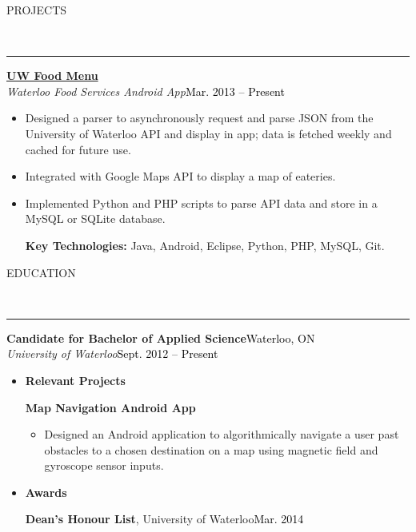 \documentclass[11pt, letterpaper, oneside]{article}
\newcommand{\HRule}[2]{\textcolor{#1}{\rule{\linewidth}{#2}}}
\newcommand{\sectiontitle}[1]{\begin{minipage}{\textwidth}\vspace{-7.5pt}\begin{flushleft}\hspace{-20.5pt}\vspace{-25pt}
\Large\MakeUppercase{#1}\end{flushleft}\end{minipage}\\\HRule{black}{0.15mm}\vspace{\baselineskip}}
\newenvironment{ressection}[1]{
  \sectiontitle{#1}}
  {\vspace{-\baselineskip}}
\newcommand{\resentryheader}[4]{
    \vspace{-6pt}
    \textbf{#1}\hspace{\stretch{1}}\textcolor{black}{#3}\\
    \textit{#2}\hspace{\stretch{1}}\textcolor{black}{#4}\\
}
\newcommand{\resitem}[1]{
    \vspace{2pt}
    \item \begin{flushleft} #1 \end{flushleft}
}
\newcommand{\resinneritem}[1]{
	\vspace{-5pt}
    \item \begin{flushleft} #1 \end{flushleft}
}
\newcommand{\resawardentry}[3]{
  \begin{minipage}{6.3in}
  \hspace{-24pt}\textbf{#1},
  {#2}\hfill\textcolor{black}{#3}\\
  \vspace{-5pt}
  \vspace{0.5\baselineskip}
  \end{minipage}
}
\newenvironment{resentry}[4]{
  \begin{minipage}{\textwidth}
  \vspace{-3pt}
    \resentryheader{#1}{#2}{#3}{#4}
        \vspace{-\baselineskip}
    \begin{itemize}[noitemsep,nolistsep]
}{
    \end{itemize}
        \vspace{\baselineskip}
        \end{minipage}
}
\begin{document}
\begin{ressection}{Projects}
  \begin{resentry}{\href{https://play.google.com/store/apps/details?id=ca.uwaterloo.uwfoodservices&hl=en}{UW Food Menu}}{Waterloo Food Services Android App}{}{Mar. 2013 -- Present}
    \resitem{Designed a parser to asynchronously request and parse JSON from the University of Waterloo API and display in app; data is fetched weekly and cached for future use.}
    \resitem{Integrated with Google Maps API to display a map of eateries.}
    \resitem{Implemented Python and PHP scripts to parse API data and store in a MySQL or SQLite database.}
    \vspace{4pt} \hspace{-15pt}
    \textbf{Key Technologies:} Java, Android, Eclipse, Python, PHP, MySQL, Git.
  \end{resentry}
\end{ressection}

\begin{ressection}{Education}
  \begin{resentry}{Candidate for Bachelor of Applied Science}{University of Waterloo}{Waterloo, ON}{Sept. 2012 -- Present}
    \resitem{\textbf{Relevant Projects}}
	\textbf{\hspace{5pt}Map Navigation Android App}   
    \begin{itemize}
		\resinneritem{Designed an Android application to algorithmically navigate a user past obstacles to a chosen destination on a map using magnetic field and gyroscope sensor inputs.}
	\end{itemize}
	\resitem{\textbf{Awards}}
	\begin{itemize}
  	\resawardentry{\hspace{5pt} Dean's Honour List}{University of Waterloo}{Mar. 2014}
	\end{itemize}
  \end{resentry}
\end{ressection}
\end{document}
